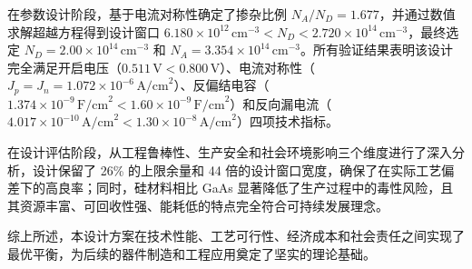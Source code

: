 \documentclass[12pt,a4paper]{article}
\begin{document}
在参数设计阶段，基于电流对称性确定了掺杂比例 $N_A/N_D = 1.677$，并通过数值求解超越方程得到设计窗口 $6.180 \times 10^{12}\,\text{cm}^{-3} < N_D < 2.720 \times 10^{14}\,\text{cm}^{-3}$，最终选定 $N_D = 2.00 \times 10^{14}\,\text{cm}^{-3}$ 和 $N_A = 3.354 \times 10^{14}\,\text{cm}^{-3}$。所有验证结果表明该设计完全满足开启电压（$0.511\,\text{V} < 0.800\,\text{V}$）、电流对称性（$J_p = J_n = 1.072 \times 10^{-6}\,\text{A/cm}^2$）、反偏结电容（$1.374 \times 10^{-9}\,\text{F/cm}^2 < 1.60 \times 10^{-9}\,\text{F/cm}^2$）和反向漏电流（$4.017 \times 10^{-10}\,\text{A/cm}^2 < 1.30 \times 10^{-8}\,\text{A/cm}^2$）四项技术指标。

在设计评估阶段，从工程鲁棒性、生产安全和社会环境影响三个维度进行了深入分析，设计保留了 26\% 的上限余量和 44 倍的设计窗口宽度，确保了在实际工艺偏差下的高良率；同时，硅材料相比 GaAs 显著降低了生产过程中的毒性风险，且其资源丰富、可回收性强、能耗低的特点完全符合可持续发展理念。

综上所述，本设计方案在技术性能、工艺可行性、经济成本和社会责任之间实现了最优平衡，为后续的器件制造和工程应用奠定了坚实的理论基础。
\end{document}
